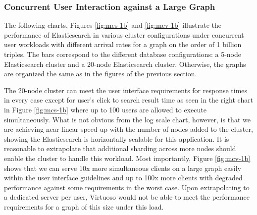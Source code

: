 \subsubsection{Concurrent User Interaction against a Large Graph}
The following charts, Figures \ref{fig:mcs-1b} and \ref{fig:mcv-1b} illustrate the performance of Elasticsearch in various cluster configurations under concurrent user workloads with different arrival rates for a graph on the order of 1 billion triples. 
The bars correspond to the different database configurations: a 5-node Elasticsearch cluster and a 20-node Elasticsearch cluster. 
Otherwise, the graphs are organized the same as in the figures of the previous section.

The 20-node cluster can meet the user interface requirements for response times in every case except for user's click to search result time as seen in the right chart in Figure \ref{fig:mcs-1b} where up to 100 users are allowed to execute simultaneously.  
What is not obvious from the log scale chart, however, is that we are achieving near linear speed up with the number of nodes added to the cluster, showing the Elasticsearch is horizontally scalable for this application.
It is reasonable to extrapolate that additional sharding across more nodes should enable the cluster to handle this workload.
Most importantly, Figure \ref{fig:mcv-1b} shows that we can serve 10x more simultaneous clients on a large graph easily within the user interface guidelines and up to 100x more clients with degraded performance against some requirements in the worst case.  
Upon extrapolating to a dedicated server per user, Virtuoso would not be able to meet the performance requirements for a graph of this size under this load.
